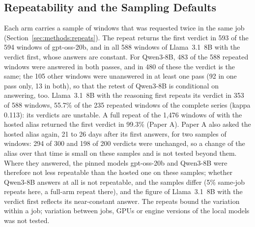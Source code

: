 \subsection{Repeatability and the Sampling Defaults}
\label{sec:results:repeat}

Each arm carries a sample of windows that was requested twice in the same job (Section~\ref{sec:methods:repeats}). The repeat returns the first verdict in 593 of the 594 windows of gpt-oss-20b, and in all 588 windows of Llama~3.1~8B with the verdict first, whose answers are constant. For Qwen3-8B, 483 of the 588 repeated windows were answered in both passes, and in 480 of these the verdict is the same; the 105 other windows were unanswered in at least one pass (92 in one pass only, 13 in both), so that the retest of Qwen3-8B is conditional on answering, too. Llama~3.1~8B with the reasoning first repeats its verdict in 353 of 588 windows, 55.7\% of the 235 repeated windows of the complete series (kappa 0.113): its verdicts are unstable. A full repeat of the 1{,}476 windows of  with the hosted alias returned the first verdict in 99.3\% (Paper A). Paper A also asked the hosted alias again, 21 to 26 days after its first answers, for two samples of windows: 294 of 300 and 198 of 200 verdicts were unchanged, so a change of the alias over that time is small on these samples and is not tested beyond them. Where they answered, the pinned models gpt-oss-20b and Qwen3-8B were therefore not less repeatable than the hosted one on these samples; whether Qwen3-8B answers at all is not repeatable, and the samples differ (5\% same-job repeats here, a full-arm repeat there), and the figure of Llama~3.1~8B with the verdict first reflects its near-constant answer. The repeats bound the variation within a job; variation between jobs, GPUs or engine versions of the local models was not tested.

